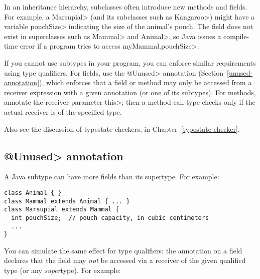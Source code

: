 In an inheritance hierarchy, subclasses often introduce new methods and
fields.  For example, a \<Marsupial> (and its subclasses such as
\<Kangaroo>) might have a variable \<pouchSize> indicating the size of the animal's
pouch.  The field does not exist in superclasses such as
\<Mammal> and \<Animal>, so Java issues a compile-time
error if a program tries to access \<myMammal.pouchSize>.

If you cannot use subtypes in your program, you can enforce similar
requirements using type qualifiers.
For fields, use the \<@Unused> annotation (Section~\ref{unused-annotation}), which enforces that a field or method may only
be accessed from a receiver expression with a given annotation (or one of
its subtypes).
For methods, annotate the receiver parameter \<this>; then a method call
type-checks only if the actual receiver is of the specified type.




Also see the discussion of typestate checkers, in
Chapter~\ref{typestate-checker}.


\subsection{\<@Unused> annotation\label{unused-annotation}}

A Java subtype can have more fields than its supertype.  For example:

\begin{Verbatim}
class Animal { }
class Mammal extends Animal { ... }
class Marsupial extends Mammal {
  int pouchSize;  // pouch capacity, in cubic centimeters
  ...
}
\end{Verbatim}

You can simulate
the same effect for type qualifiers:
the  annotation
on a field declares that the field may \emph{not} be accessed via a receiver of
the given qualified type (or any \emph{super}type).
For example:


